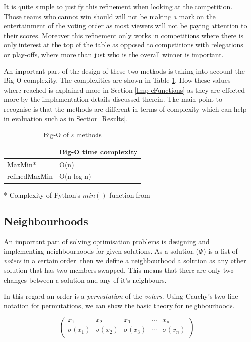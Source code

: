 \documentclass[12pt]{report}
\begin{document}
It is quite simple to justify this refinement when looking at the competition. Those teams who cannot win should will not be making a mark on the entertainment of the voting order as most viewers will not be paying attention to their scores. Moreover this refinement only works in competitions where there is only interest at the top of the table as opposed to competitions with relegations or play-offs, where more than just who is the overall winner is important.

An important part of the design of these two methods is taking into account the Big-O complexity. The complexities are shown in Table \ref{maxMinComp}. How these values where reached is explained more in Section \ref{Imp-eFunctions} as they are effected more by the implementation details discussed therein. The main point to recognise is that the methods are different in terms of complexity which can help in evaluation such as in Section \ref{Results}.

\begin{table}[H]
\centering
\caption{Big-O of $\varepsilon$ methods}
\label{maxMinComp}
\begin{tabular}{|l|l|}
\hline
              & Big-O time complexity \\ \hline
MaxMin*  & O(n) \\ \hline
refinedMaxMin & O(n log n)               \\ \hline
\end{tabular}
\end{table}
* Complexity of Python's $min()$ function from\cite{PythonComplexities}

\subsection{Neighbourhoods}\label{Neighbours}
An important part of solving optimisation problems is designing and implementing neighbourhoods for given solutions. As a solution ($\Phi$) is a list of \textit{voters} in a certain order, then we define a neighbourhood a solution as any other solution that has two members swapped. This means that there are only two changes between a solution and any of it's neighbours.

In this regard an order is a \textit{permutation} of the \textit{voters}. Using Cauchy's two line notation for permutations\cite{Cauchy}, we can show the basic theory for neighbourhoods.

\begin{equation}\label{neighbourhood}
\begin{pmatrix}
x_{1} & x_{2} & x_{3} & \cdots & x_{n} \\
\sigma(x_{1}) & \sigma(x_{2}) & \sigma(x_{3}) & \cdots & \sigma(x_{n}) \\
\end{pmatrix}
\end{equation}
\end{document}
